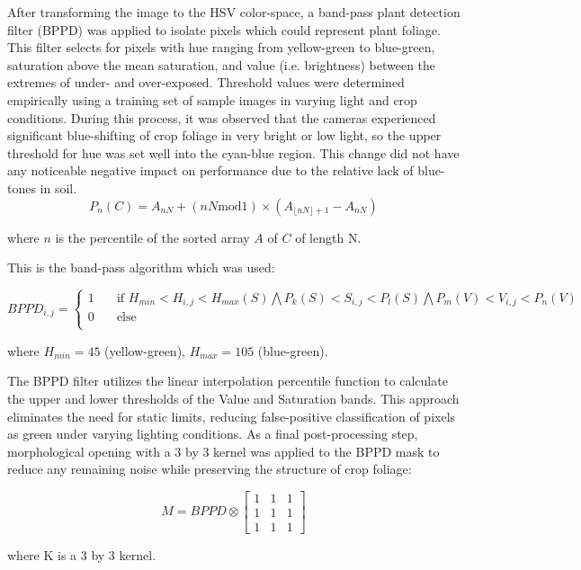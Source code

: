 After transforming the image to the HSV color-space, a band-pass plant
detection filter (BPPD) was applied to isolate pixels which could
represent plant foliage. This filter selects for pixels with hue
ranging from yellow-green to blue-green, saturation above the mean
saturation, and value (i.e. brightness) between the extremes of under-
and over-exposed. Threshold values were determined empirically using a
training set of sample images in varying light and crop
conditions. During this process, it was observed that the cameras
experienced significant blue-shifting of crop foliage in very bright
or low light, so the upper threshold for hue was set well into the
cyan-blue region. This change did not have any noticeable negative
impact on performance due to the relative lack of blue-tones in soil.
\begin{equation}
  P_{n}(C) = A_{nN} + (nN \text{mod} 1) \times (A_{\lfloor nN \rfloor + 1}-A_{nN})
  \label{eq:percentile}
\end{equation}
\begin{flushleft}
where $n$ is the percentile of the  sorted array $A$ of $C$ of length N.
\end{flushleft}

This is the band-pass algorithm which was used:

\begin{equation}
BPPD_{i,j} =
  \begin{cases}
    1  & \quad \text{if } H_{min}<H_{i,j}<H_{max}(S) \bigwedge P_{k}(S)< S_{i,j} <P_{l}(S) \bigwedge P_{m}(V)< V_{i,j}<P_{n}(V)\text{ }\\
    0  & \quad \text{else}\\
  \end{cases}
  \label{eq:bppd}
\end{equation}
\begin{flushleft}
where $H_{min}=45$ (yellow-green), $H_{max}=105$ (blue-green).
\end{flushleft}

The BPPD filter utilizes the linear interpolation percentile function
to calculate the upper and lower thresholds of the Value and
Saturation bands. This approach eliminates the need for static limits,
reducing false-positive classification of pixels as green under
varying lighting conditions. As a final post-processing step,
morphological opening with a 3 by 3 kernel was applied to the BPPD
mask to reduce any remaining noise while preserving the structure of
crop foliage:

\begin{equation}
M = BPPD \otimes
\begin{bmatrix}
       1 & 1 & 1 \\
       1 & 1 & 1 \\
       1 & 1 & 1
     \end{bmatrix}
\label{eq:morph_opening}
\end{equation}
\begin{flushleft}
where K is a 3 by 3 kernel.
\end{flushleft}

